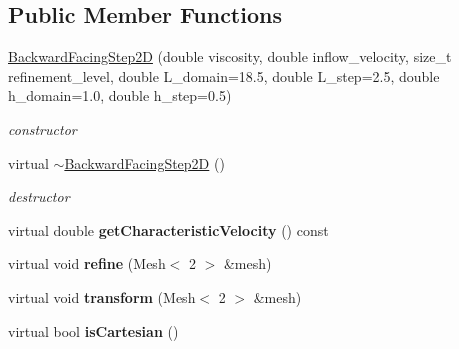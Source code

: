 \subsection*{Public Member Functions}
\begin{DoxyCompactItemize}
\item 
\hypertarget{classnatrium_1_1BackwardFacingStep2D_acee242cbe42db517032d784ea9667755}{
\hyperlink{classnatrium_1_1BackwardFacingStep2D_acee242cbe42db517032d784ea9667755}{BackwardFacingStep2D} (double viscosity, double inflow\_\-velocity, size\_\-t refinement\_\-level, double L\_\-domain=18.5, double L\_\-step=2.5, double h\_\-domain=1.0, double h\_\-step=0.5)}
\label{classnatrium_1_1BackwardFacingStep2D_acee242cbe42db517032d784ea9667755}

\begin{DoxyCompactList}\small\item\em constructor \item\end{DoxyCompactList}\item 
\hypertarget{classnatrium_1_1BackwardFacingStep2D_a5eba90130e3ba07642ac092617f81f9d}{
virtual \hyperlink{classnatrium_1_1BackwardFacingStep2D_a5eba90130e3ba07642ac092617f81f9d}{$\sim$BackwardFacingStep2D} ()}
\label{classnatrium_1_1BackwardFacingStep2D_a5eba90130e3ba07642ac092617f81f9d}

\begin{DoxyCompactList}\small\item\em destructor \item\end{DoxyCompactList}\item 
\hypertarget{classnatrium_1_1BackwardFacingStep2D_a6f8e1c7c911c7f15c503530352075218}{
virtual double {\bfseries getCharacteristicVelocity} () const }
\label{classnatrium_1_1BackwardFacingStep2D_a6f8e1c7c911c7f15c503530352075218}

\item 
\hypertarget{classnatrium_1_1BackwardFacingStep2D_a9f1629d0fd14226b3b8360752e62dba2}{
virtual void {\bfseries refine} (Mesh$<$ 2 $>$ \&mesh)}
\label{classnatrium_1_1BackwardFacingStep2D_a9f1629d0fd14226b3b8360752e62dba2}

\item 
\hypertarget{classnatrium_1_1BackwardFacingStep2D_abc272e3f4e2bc5a5fd5aa56c67fe354a}{
virtual void {\bfseries transform} (Mesh$<$ 2 $>$ \&mesh)}
\label{classnatrium_1_1BackwardFacingStep2D_abc272e3f4e2bc5a5fd5aa56c67fe354a}

\item 
\hypertarget{classnatrium_1_1BackwardFacingStep2D_a348a6b0c001ac4bf30b0dfff5f682094}{
virtual bool {\bfseries isCartesian} ()}
\label{classnatrium_1_1BackwardFacingStep2D_a348a6b0c001ac4bf30b0dfff5f682094}

\end{DoxyCompactItemize}


